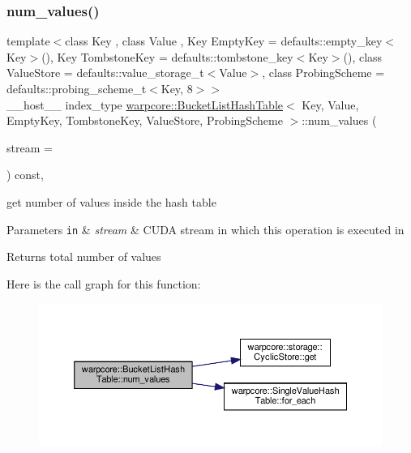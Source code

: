 \subsubsection{\texorpdfstring{num\+\_\+values()}{num\_values()}\hspace{0.1cm}{\footnotesize\ttfamily [3/3]}}
{\footnotesize\ttfamily template$<$class Key , class Value , Key Empty\+Key = defaults\+::empty\+\_\+key$<$\+Key$>$(), Key Tombstone\+Key = defaults\+::tombstone\+\_\+key$<$\+Key$>$(), class Value\+Store  = defaults\+::value\+\_\+storage\+\_\+t$<$\+Value$>$, class Probing\+Scheme  = defaults\+::probing\+\_\+scheme\+\_\+t$<$\+Key, 8$>$$>$ \\
\+\_\+\+\_\+host\+\_\+\+\_\+ index\+\_\+type \hyperlink{classwarpcore_1_1BucketListHashTable}{warpcore\+::\+Bucket\+List\+Hash\+Table}$<$ Key, Value, Empty\+Key, Tombstone\+Key, Value\+Store, Probing\+Scheme $>$\+::num\+\_\+values (\begin{DoxyParamCaption}\item[{const cuda\+Stream\+\_\+t}]{stream = {} }\end{DoxyParamCaption}) const\hspace{0.3cm}{\ttfamily [inline]}, {\ttfamily [noexcept]}}



get number of values inside the hash table 


\begin{DoxyParams}[1]{Parameters}
\mbox{\tt in}  & {\em stream} & C\+U\+DA stream in which this operation is executed in \\
\hline
\end{DoxyParams}
\begin{DoxyReturn}{Returns}
total number of values 
\end{DoxyReturn}
Here is the call graph for this function\+:
\nopagebreak
\begin{figure}[H]
\begin{center}
\leavevmode
\includegraphics[width=350pt]{classwarpcore_1_1BucketListHashTable_a872b991005419699dfb39d873b950f18_cgraph}
\end{center}
\end{figure}
\mbox{\label{classwarpcore_1_1BucketListHashTable_a25416b0266a4e91d8d85e1ee6571508c}} 
